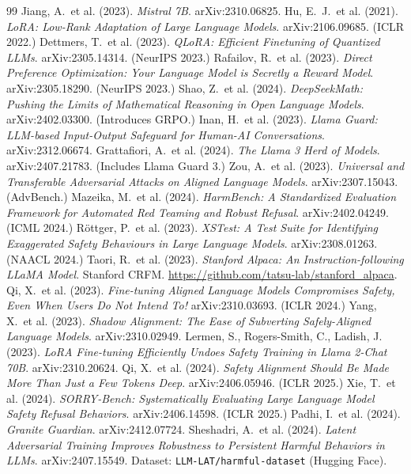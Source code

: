 \documentclass[11pt,a4paper]{article}
\begin{document}
\begin{thebibliography}{99}
\small
{} Jiang, A.\ et al. (2023). \emph{Mistral 7B}. arXiv:2310.06825.
 Hu, E.\ J.\ et al. (2021). \emph{LoRA: Low-Rank Adaptation of Large Language Models}. arXiv:2106.09685. (ICLR 2022.)
 Dettmers, T.\ et al. (2023). \emph{QLoRA: Efficient Finetuning of Quantized LLMs}. arXiv:2305.14314. (NeurIPS 2023.)
 Rafailov, R.\ et al. (2023). \emph{Direct Preference Optimization: Your Language Model is Secretly a Reward Model}. arXiv:2305.18290. (NeurIPS 2023.)
 Shao, Z.\ et al. (2024). \emph{DeepSeekMath: Pushing the Limits of Mathematical Reasoning in Open Language Models}. arXiv:2402.03300. (Introduces GRPO.)
 Inan, H.\ et al. (2023). \emph{Llama Guard: LLM-based Input-Output Safeguard for Human-AI Conversations}. arXiv:2312.06674.
 Grattafiori, A.\ et al. (2024). \emph{The Llama 3 Herd of Models}. arXiv:2407.21783. (Includes Llama Guard 3.)
 Zou, A.\ et al. (2023). \emph{Universal and Transferable Adversarial Attacks on Aligned Language Models}. arXiv:2307.15043. (AdvBench.)
 Mazeika, M.\ et al. (2024). \emph{HarmBench: A Standardized Evaluation Framework for Automated Red Teaming and Robust Refusal}. arXiv:2402.04249. (ICML 2024.)
 R\"ottger, P.\ et al. (2023). \emph{XSTest: A Test Suite for Identifying Exaggerated Safety Behaviours in Large Language Models}. arXiv:2308.01263. (NAACL 2024.)
 Taori, R.\ et al. (2023). \emph{Stanford Alpaca: An Instruction-following LLaMA Model}. Stanford CRFM. \url{https://github.com/tatsu-lab/stanford_alpaca}.
 Qi, X.\ et al. (2023). \emph{Fine-tuning Aligned Language Models Compromises Safety, Even When Users Do Not Intend To!} arXiv:2310.03693. (ICLR 2024.)
 Yang, X.\ et al. (2023). \emph{Shadow Alignment: The Ease of Subverting Safely-Aligned Language Models}. arXiv:2310.02949.
 Lermen, S., Rogers-Smith, C., Ladish, J. (2023). \emph{LoRA Fine-tuning Efficiently Undoes Safety Training in Llama 2-Chat 70B}. arXiv:2310.20624.
 Qi, X.\ et al. (2024). \emph{Safety Alignment Should Be Made More Than Just a Few Tokens Deep}. arXiv:2406.05946. (ICLR 2025.)
 Xie, T.\ et al. (2024). \emph{SORRY-Bench: Systematically Evaluating Large Language Model Safety Refusal Behaviors}. arXiv:2406.14598. (ICLR 2025.)
 Padhi, I.\ et al. (2024). \emph{Granite Guardian}. arXiv:2412.07724.
 Sheshadri, A.\ et al. (2024). \emph{Latent Adversarial Training Improves Robustness to Persistent Harmful Behaviors in LLMs}. arXiv:2407.15549. Dataset: \texttt{LLM-LAT/harmful-dataset} (Hugging Face).

\end{thebibliography}
\end{document}
